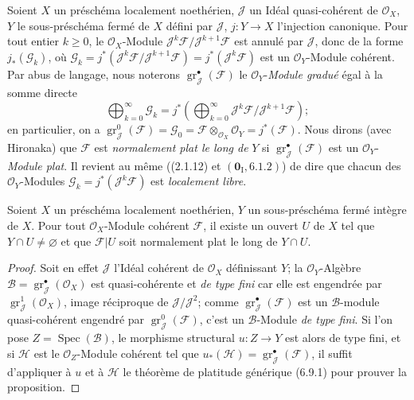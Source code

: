 \begin{env}[6.10.1]
Soient $X$ un préschéma localement noethérien, $\mathcal J$ un Idéal
quasi-cohérent de $\mathcal O_X$, $Y$ le sous-préschéma fermé de $X$ défini
par $\mathcal J$, $j:Y\to X$ l'injection canonique. Pour tout entier $k\geq0$,
le $\mathcal O_X$-Module
$\mathcal J^k\mathcal F/\mathcal J^{k+1}\mathcal F$ est annulé par
$\mathcal J$, donc de la forme $j_*(\mathcal G_k)$, où $\mathcal G_k=j^*(\mathcal J^k\mathcal F/\mathcal J^{k+1}\mathcal F)=j^*(\mathcal J^k\mathcal F)$
est un $\mathcal O_Y$-Module cohérent. Par abus de langage, nous noterons
$\operatorname{gr}_{\mathcal J}^{\bullet}(\mathcal F)$ le
$\mathcal O_Y$-\emph{Module gradué} égal à la somme directe
\[
\bigoplus_{k=0}^{\infty}\mathcal G_k
=j^*\left(\bigoplus_{k=0}^{\infty}
\mathcal J^k\mathcal F/\mathcal J^{k+1}\mathcal F\right);
\]
en particulier, on a
$\operatorname{gr}_{\mathcal J}^{0}(\mathcal F)=\mathcal G_0
=\mathcal F\otimes_{\mathcal O_X}\mathcal O_Y=j^*(\mathcal F)$. Nous dirons
(avec Hironaka) que $\mathcal F$ est \emph{normalement plat le long de} $Y$ si
$\operatorname{gr}_{\mathcal J}^{\bullet}(\mathcal F)$ est un
$\mathcal O_Y$-\emph{Module plat}. Il revient au même ((2.1.12) et
$(\mathbf{0}_{\mathrm I},6.1.2)$) de dire que chacun des $\mathcal O_Y$-Modules
$\mathcal G_k=j^*(\mathcal J^k\mathcal F)$ est \emph{localement libre}.
\end{env}

\begin{proposition}[6.10.2]
\label{IV.2.s6.10.2-fr}
Soient $X$ un préschéma localement noethérien, $Y$ un sous-préschéma fermé
\textup{intègre} de $X$. Pour tout $\mathcal O_X$-Module cohérent $\mathcal F$, il
existe un ouvert $U$ de $X$ tel que $Y\cap U\ne\varnothing$ et que
$\mathcal F|U$ soit normalement plat le long de $Y\cap U$.
\end{proposition}

\begin{proof}
Soit en effet $\mathcal J$ l'Idéal cohérent de $\mathcal O_X$ définissant
$Y$; la $\mathcal O_Y$-Algèbre
$\mathcal B=\operatorname{gr}_{\mathcal J}^{\bullet}(\mathcal O_X)$ est
quasi-cohérente et \emph{de type fini} car elle est engendrée par
$\operatorname{gr}_{\mathcal J}^{1}(\mathcal O_X)$, image réciproque de
$\mathcal J/\mathcal J^2$; comme
$\operatorname{gr}_{\mathcal J}^{\bullet}(\mathcal F)$ est un
$\mathcal B$-module quasi-cohérent engendré par
$\operatorname{gr}_{\mathcal J}^{0}(\mathcal F)$, c'est un
$\mathcal B$-Module \emph{de type fini}. Si l'on pose
$Z=\operatorname{Spec}(\mathcal B)$, le morphisme structural $u:Z\to Y$ est
alors de type fini, et si $\mathcal H$ est le $\mathcal O_Z$-Module cohérent
tel que $u_*(\mathcal H)=\operatorname{gr}_{\mathcal J}^{\bullet}(\mathcal F)$,
il suffit d'appliquer à $u$ et à $\mathcal H$ le théorème de platitude
générique (6.9.1) pour prouver la proposition.
\end{proof}

